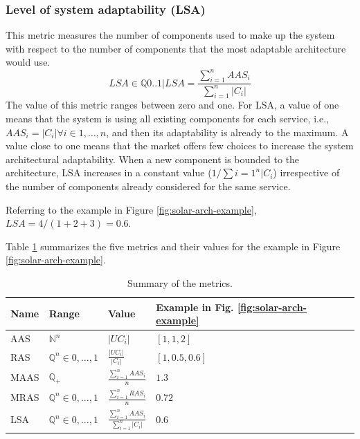 \subsubsection{Level of system adaptability (LSA)}
This metric measures the number of components used to make up the system with respect to the number of components that the most adaptable architecture would use.
\[ LSA \in \mathbb{Q}{0..1} | LSA = \frac{\sum_{i=1}^{n}AAS_i}{\sum_{i=1}^{n}|C_i|} \]
The value of this metric ranges between zero and one. For LSA, a value of one means that the system is using all existing components for each service, i.e., $AAS_i = |C_i | \forall i \in {1,\dots, n}$, and then its adaptability is already to the maximum. A value close to one means that the market offers few choices to increase the system architectural adaptability. When a new component is bounded to the architecture, LSA increases in a constant value ($1/\sum{{i=1}^{n}|C_i}$) irrespective of the number of components already considered for the same service.

\noindent Referring to the example in Figure \ref{fig:solar-arch-example}, $LSA = 4/(1 + 2 + 3) = 0.6$.

Table \ref{tab:solar-metrics-summary} summarizes the five metrics and their values for the example in Figure \ref{fig:solar-arch-example}.

\begin{table}[ht!b]
	\centering
	\begin{tabular}{|l|l|l|l|}
		\hline 
		Name & Range & Value & Example in Fig. \ref{fig:solar-arch-example} \\ 
		\hline 
		AAS & $\mathbb{N}^n$ & ${|UC_i|}$ & $[1,1,2]$ \\

		RAS & $\mathbb{Q}^n \in {0,\dots,1}$ & ${\frac{|UC_i|}{|C_i|}}$ & $[1,0.5,0.6]$ \\ 

		MAAS & $\mathbb{Q}_+$ & $\frac{\sum_{i=1}^{n}AAS_i}{n}$ & $1.3$ \\ 

		MRAS & $\mathbb{Q}^n \in {0,\dots,1}$ & $\frac{\sum_{i=1}^{n}RAS_i}{n}$ & $0.72$ \\ 
		
		LSA & $\mathbb{Q}^n \in {0,\dots,1}$ & $\frac{\sum_{i=1}^{n}AAS_i}{\sum_{i=1}^{n}|C_i|}$ & $0.6$ \\
		\hline 
		
	\end{tabular} 
	\caption[SOLAR Metrics]{Summary of the metrics.\cite{solar}}
	\label{tab:solar-metrics-summary}
\end{table}

